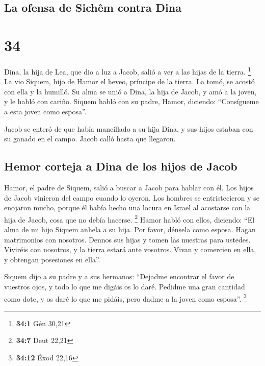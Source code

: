 \hypertarget{la-ofensa-de-sichuxeam-contra-dina}{%
\subsection{La ofensa de Sichêm contra
Dina}\label{la-ofensa-de-sichuxeam-contra-dina}}

\hypertarget{section-33}{%
\section{34}\label{section-33}}

 Dina, la hija de Lea, que dio a luz a Jacob, salió a ver
a las hijas de la tierra. \footnote{\textbf{34:1} Gén 30,21}
 La vio Siquem, hijo de Hamor el heveo, príncipe de la
tierra. La tomó, se acostó con ella y la humilló.  Su alma
se unió a Dina, la hija de Jacob, y amó a la joven, y le habló con
cariño.  Siquem habló con su padre, Hamor, diciendo:
``Consígueme a esta joven como esposa''.

 Jacob se enteró de que había mancillado a su hija Dina, y
sus hijos estaban con su ganado en el campo. Jacob calló hasta que
llegaron.

\hypertarget{hemor-corteja-a-dina-de-los-hijos-de-jacob}{%
\subsection{Hemor corteja a Dina de los hijos de
Jacob}\label{hemor-corteja-a-dina-de-los-hijos-de-jacob}}

 Hamor, el padre de Siquem, salió a buscar a Jacob para
hablar con él.  Los hijos de Jacob vinieron del campo
cuando lo oyeron. Los hombres se entristecieron y se enojaron mucho,
porque él había hecho una locura en Israel al acostarse con la hija de
Jacob, cosa que no debía hacerse. \footnote{\textbf{34:7} Deut 22,21}
 Hamor habló con ellos, diciendo: ``El alma de mi hijo
Siquem anhela a su hija. Por favor, dénsela como esposa. 
Hagan matrimonios con nosotros. Dennos sus hijas y tomen las nuestras
para ustedes.  Viviréis con nosotros, y la tierra estará
ante vosotros. Vivan y comercien en ella, y obtengan posesiones en
ella''.

 Siquem dijo a su padre y a sus hermanos: ``Dejadme
encontrar el favor de vuestros ojos, y todo lo que me digáis os lo daré.
 Pedidme una gran cantidad como dote, y os daré lo que me
pidáis, pero dadme a la joven como esposa''. \footnote{\textbf{34:12}
  Éxod 22,16}

